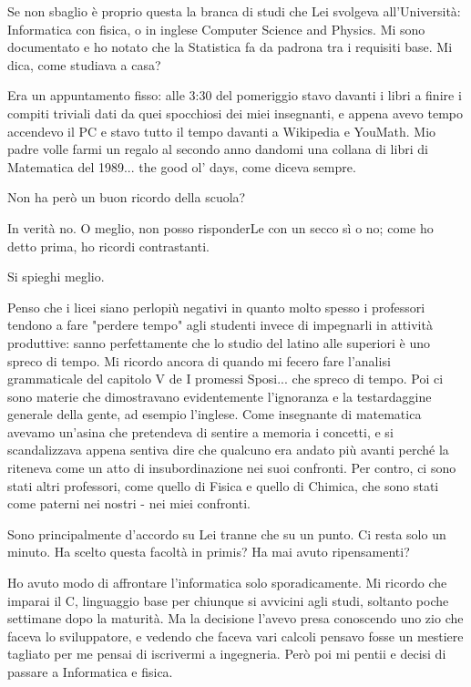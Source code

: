 \documentclass[a4paper,12pt]{article}
\newcommand{\Walter}{\speak{W}}
\newcommand{\Pollazzi}{\speak{P}}
\begin{document}
\begin{dialogue}
\Pollazzi Se non sbaglio è proprio questa la branca di studi che Lei svolgeva all'Università: Informatica con fisica, o in inglese Computer Science and Physics. Mi sono documentato e ho notato che la Statistica fa da padrona tra i requisiti base. Mi dica, come studiava a casa?

\Walter Era un appuntamento fisso: alle 3:30 del pomeriggio stavo davanti i libri a finire i compiti triviali dati da quei spocchiosi dei miei insegnanti, e appena avevo tempo accendevo il PC e stavo tutto il tempo davanti a Wikipedia e YouMath. Mio padre volle farmi un regalo al secondo anno dandomi una collana di libri di Matematica del 1989... the good ol' days, come diceva sempre.

\Pollazzi Non ha però un buon ricordo della scuola?

\Walter In verità no. O meglio, non posso risponderLe con un secco sì o no; come ho detto prima, ho ricordi contrastanti.

\Pollazzi Si spieghi meglio.

\Walter Penso che i licei siano perlopiù negativi in quanto molto spesso i professori tendono a fare "perdere tempo" agli studenti invece di impegnarli in attività produttive: sanno perfettamente che lo studio del latino alle superiori è uno spreco di tempo. Mi ricordo ancora di quando mi fecero fare l'analisi grammaticale del capitolo V de I promessi Sposi... che spreco di tempo. Poi ci sono materie che dimostravano evidentemente l'ignoranza e la testardaggine generale della gente, ad esempio l'inglese. Come insegnante di matematica avevamo un’asina che pretendeva di sentire a memoria i concetti, e si scandalizzava appena sentiva dire che qualcuno era andato più avanti perché la riteneva come un atto di insubordinazione nei suoi confronti. Per contro, ci sono stati altri professori, come quello di Fisica e quello di Chimica, che sono stati come paterni nei nostri - nei miei confronti.

\Pollazzi Sono principalmente d'accordo su Lei tranne che su un punto.  Ci resta solo un minuto. Ha scelto questa facoltà in primis? Ha mai avuto ripensamenti?

\Walter Ho avuto modo di affrontare l'informatica solo sporadicamente. Mi ricordo che imparai il C, linguaggio base per chiunque si avvicini agli studi, soltanto poche settimane dopo la maturità. Ma la decisione l'avevo presa conoscendo uno zio che faceva lo sviluppatore, e vedendo che faceva vari calcoli pensavo fosse un mestiere tagliato per me pensai di iscrivermi a ingegneria. Però poi mi pentii e decisi di passare a Informatica e fisica.


\end{dialogue}
\end{document}
